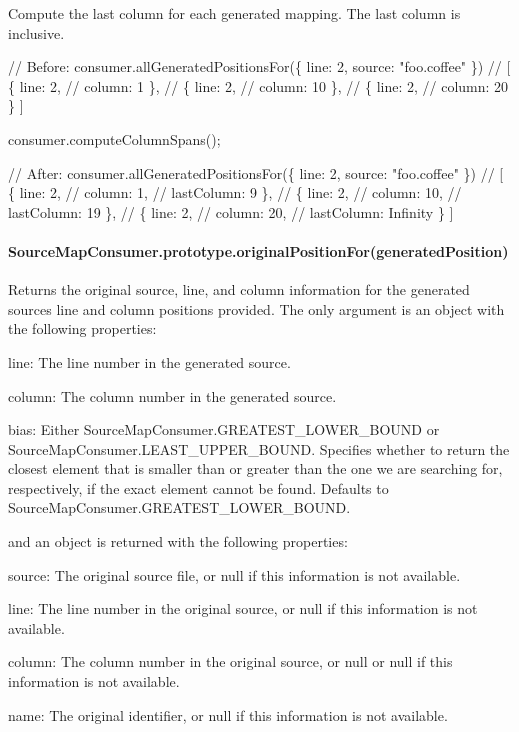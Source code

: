 Compute the last column for each generated mapping. The last column is inclusive.


\begin{DoxyCode}
// Before:
consumer.allGeneratedPositionsFor(\{ line: 2, source: "foo.coffee" \})
// [ \{ line: 2,
//     column: 1 \},
//   \{ line: 2,
//     column: 10 \},
//   \{ line: 2,
//     column: 20 \} ]

consumer.computeColumnSpans();

// After:
consumer.allGeneratedPositionsFor(\{ line: 2, source: "foo.coffee" \})
// [ \{ line: 2,
//     column: 1,
//     lastColumn: 9 \},
//   \{ line: 2,
//     column: 10,
//     lastColumn: 19 \},
//   \{ line: 2,
//     column: 20,
//     lastColumn: Infinity \} ]
\end{DoxyCode}


\paragraph*{Source\+Map\+Consumer.\+prototype.\+original\+Position\+For(generated\+Position)}

Returns the original source, line, and column information for the generated source\textquotesingle{}s line and column positions provided. The only argument is an object with the following properties\+:


\begin{DoxyItemize}
\item {\ttfamily line}\+: The line number in the generated source.
\item {\ttfamily column}\+: The column number in the generated source.
\item {\ttfamily bias}\+: Either {\ttfamily Source\+Map\+Consumer.\+G\+R\+E\+A\+T\+E\+S\+T\+\_\+\+L\+O\+W\+E\+R\+\_\+\+B\+O\+U\+ND} or {\ttfamily Source\+Map\+Consumer.\+L\+E\+A\+S\+T\+\_\+\+U\+P\+P\+E\+R\+\_\+\+B\+O\+U\+ND}. Specifies whether to return the closest element that is smaller than or greater than the one we are searching for, respectively, if the exact element cannot be found. Defaults to {\ttfamily Source\+Map\+Consumer.\+G\+R\+E\+A\+T\+E\+S\+T\+\_\+\+L\+O\+W\+E\+R\+\_\+\+B\+O\+U\+ND}.
\end{DoxyItemize}

and an object is returned with the following properties\+:


\begin{DoxyItemize}
\item {\ttfamily source}\+: The original source file, or null if this information is not available.
\item {\ttfamily line}\+: The line number in the original source, or null if this information is not available.
\item {\ttfamily column}\+: The column number in the original source, or null or null if this information is not available.
\item {\ttfamily name}\+: The original identifier, or null if this information is not available.
\end{DoxyItemize}


